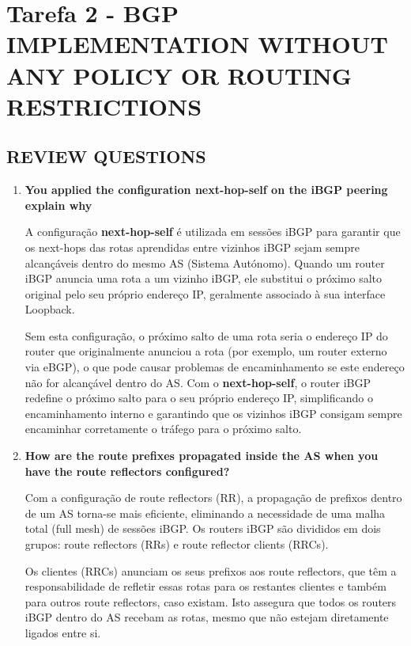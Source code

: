 \documentclass[11pt,english, openright, oneside]{book}
\begin{document}
\section{Tarefa 2 - BGP IMPLEMENTATION WITHOUT ANY POLICY OR ROUTING RESTRICTIONS}
\vspace{0.2cm}




\subsection{REVIEW QUESTIONS}
\vspace{0.2cm}

\begin{enumerate}
  \item \textbf{You applied the configuration next-hop-self on the iBGP peering explain why} 
  \vspace{0.2cm}

  A configuração \textbf{next-hop-self} é utilizada em sessões iBGP para garantir que os next-hops das rotas aprendidas entre vizinhos iBGP sejam sempre alcançáveis dentro do mesmo AS (Sistema Autónomo). Quando um router iBGP anuncia uma rota a um vizinho iBGP, ele substitui o próximo salto original pelo seu próprio endereço IP, geralmente associado à sua interface Loopback.

  Sem esta configuração, o próximo salto de uma rota seria o endereço IP do router que originalmente anunciou a rota (por exemplo, um router externo via eBGP), o que pode causar problemas de encaminhamento se este endereço não for alcançável dentro do AS. Com o \textbf{next-hop-self}, o router iBGP redefine o próximo salto para o seu próprio endereço IP, simplificando o encaminhamento interno e garantindo que os vizinhos iBGP consigam sempre encaminhar corretamente o tráfego para o próximo salto.
  \vspace{0.2cm}

  \item \textbf{How are the route prefixes propagated inside the AS when you have the route reflectors configured?} 
  \vspace{0.2cm}

  Com a configuração de route reflectors (RR), a propagação de prefixos dentro de um AS torna-se mais eficiente, eliminando a necessidade de uma malha total (full mesh) de sessões iBGP. Os routers iBGP são divididos em dois grupos: route reflectors (RRs) e route reflector clients (RRCs).

  Os clientes (RRCs) anunciam os seus prefixos aos route reflectors, que têm a responsabilidade de refletir essas rotas para os restantes clientes e também para outros route reflectors, caso existam. Isto assegura que todos os routers iBGP dentro do AS recebam as rotas, mesmo que não estejam diretamente ligados entre si.
  

\end{enumerate}
\end{document}
